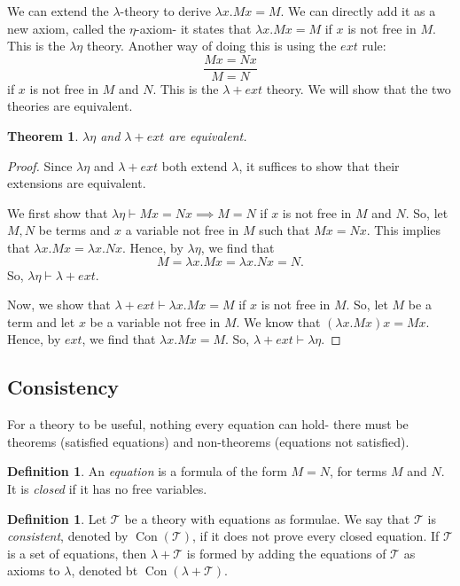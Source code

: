 \documentclass[a4paper, openany]{memoir}
\newtheorem{theorem}[proposition]{Theorem}
\theoremstyle{definition}
\newtheorem{definition}[proposition]{Definition}
\begin{document}
    We can extend the $\lambda$-theory to derive $\lambda x.Mx = M$. We can directly add it as a new axiom, called the $\eta$-axiom- it states that $\lambda x.Mx = M$ if $x$ is not free in $M$. This is the $\lambda \eta$ theory. Another way of doing this is using the $ext$ rule:
    \[\frac{Mx = Nx}{M = N}\]
    if $x$ is not free in $M$ and $N$. This is the $\lambda + ext$ theory. We will show that the two theories are equivalent.
    \begin{theorem}
        $\lambda \eta$ and $\lambda + ext$ are equivalent.
    \end{theorem}
    \begin{proof}
        Since $\lambda \eta$ and $\lambda + ext$ both extend $\lambda$, it suffices to show that their extensions are equivalent.

        We first show that $\lambda \eta \vdash Mx = Nx \implies M = N$ if $x$ is not free in $M$ and $N$. So, let $M, N$ be terms and $x$ a variable not free in $M$ such that $Mx = Nx$. This implies that $\lambda x.Mx = \lambda x.Nx$. Hence, by $\lambda \eta$, we find that
        \[M = \lambda x.Mx = \lambda x.Nx = N.\]
        So, $\lambda \eta \vdash \lambda + ext$.

        Now, we show that $\lambda + ext \vdash \lambda x.Mx = M$ if $x$ is not free in $M$. So, let $M$ be a term and let $x$ be a variable not free in $M$. We know that $(\lambda x.Mx)x = Mx$. Hence, by $ext$, we find that $\lambda x.Mx = M$. So, $\lambda + ext \vdash \lambda \eta$.
    \end{proof}

    \subsection{Consistency}
    For a theory to be useful, nothing every equation can hold- there must be theorems (satisfied equations) and non-theorems (equations not satisfied).
    \begin{definition}
        An \emph{equation} is a formula of the form $M = N$, for terms $M$ and $N$. It is \emph{closed} if it has no free variables.
    \end{definition}
    \begin{definition}
        Let $\mathcal{T}$ be a theory with equations as formulae. We say that $\mathcal{T}$ is \emph{consistent}, denoted by $\operatorname{Con}(\mathcal{T})$, if it does not prove every closed equation. If $\mathcal{T}$ is a set of equations, then $\lambda + \mathcal{T}$ is formed by adding the equations of $\mathcal{T}$ as axioms to $\lambda$, denoted bt $\operatorname{Con}(\lambda + \mathcal{T})$. 
    \end{definition}
\end{document}
